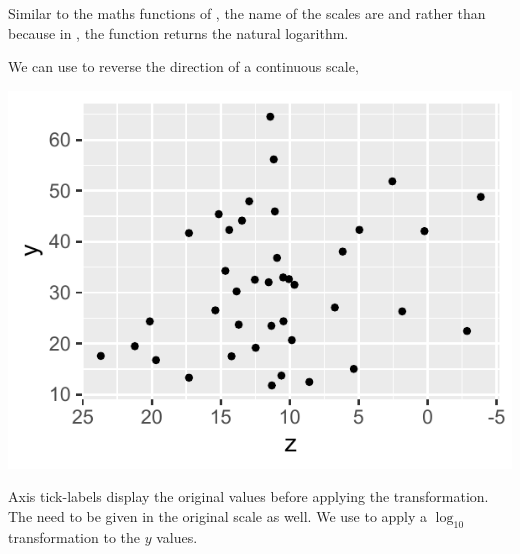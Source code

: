 \documentclass[krantz2]{krantz}\usepackage{knitr}
\begin{document}
\begin{warningbox}
  Similar to the maths functions of \Rlang, the name of the scales are  and  rather than  because in \Rlang, the function  returns the natural logarithm.
\end{warningbox}

We can use  to reverse the direction of a continuous scale,

\begin{knitrout}\footnotesize
{}\color{fgcolor}\begin{kframe}
\begin{alltt}
  \hlopt{+}
  \hlstd{()} \hlopt{+}
  \hlstd{()}
\end{alltt}
\end{kframe}

{\centering \includegraphics[width=.54\textwidth]{figure/pos-scale-trans-01-1} 

}



\end{knitrout}

Axis tick-labels display the original values before applying the transformation. The  need to be given in the original scale as well. We use  to apply a $\log_{10}$ transformation to the $y$ values.

\begin{knitrout}\footnotesize
{}\color{fgcolor}\begin{kframe}
\begin{alltt}
  \hlstd{(}\hlstd{=}\hlstd{(}\hlstd{,}\hlstd{,}\hlstd{,}\hlstd{))}
\end{alltt}
\end{kframe}
\end{knitrout}
\end{document}

